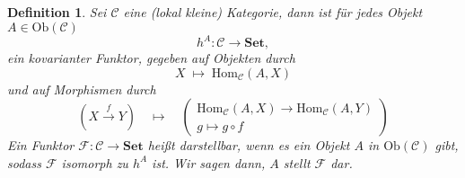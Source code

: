 \documentclass[a4paper, 11pt]{scrartcl}
\newcommand{\Hom}{\text{Hom}}
\newcommand{\Ob}{\text{Ob}}
\theoremstyle{basicstyle}
\newtheorem{definition}{Definition}[section]
\newtheorem{bemerkung}[definition]{Bemerkung}
\begin{document}

    \begin{definition}\label{def:darstellbar}
        Sei \(\mathcal{C}\) eine (lokal kleine) Kategorie, dann ist für jedes Objekt \(A \in \Ob(\mathcal{C})\)
        \[h^A: \mathcal{C} \longrightarrow \textbf{Set},\]
        ein kovarianter Funktor, gegeben auf Objekten durch
        \[X \;\mapsto\; \Hom_{\mathcal{C}}(A, X)\]
        und auf Morphismen durch
        \[\left(X \overset{f}{\longrightarrow} Y\right) \quad\mapsto\quad \begin{pmatrix} \Hom_{\mathcal{C}}(A, X) \longrightarrow \Hom_{\mathcal{C}}(A, Y) \\ g \mapsto g \circ f \end{pmatrix}\]
        Ein Funktor \(\mathcal{F}: \mathcal{C} \to \textbf{Set}\) heißt \emph{darstellbar}, wenn es ein Objekt \(A\) in \(\Ob(\mathcal{C})\) gibt, sodass \(\mathcal{F}\) isomorph zu \(h^A\) ist. %
        Wir sagen dann, \(A\) stellt \(\mathcal{F}\) dar.
    \end{definition}
\end{document}
